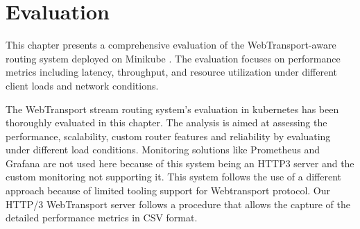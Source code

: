 




\chapter{Evaluation}
\label{chap:Evaluation}

This chapter presents a comprehensive evaluation of the WebTransport-aware routing system deployed on Minikube \cite{minikube-docs}. The evaluation focuses on performance metrics including latency, throughput, and resource utilization under different client loads and network conditions.

The WebTransport stream routing system's evaluation in kubernetes has been thoroughly evaluated in this chapter. The analysis is aimed at assessing the performance, scalability, custom router features and reliability by evaluating under different load conditions.  Monitoring solutions like Prometheus and Grafana are not used here because of this system being an HTTP3 server and the custom monitoring not supporting it. This system follows the use of a different approach because of limited tooling support for Webtransport protocol. Our HTTP/3 WebTransport server follows a procedure that allows the capture of the detailed performance metrics in CSV format.

